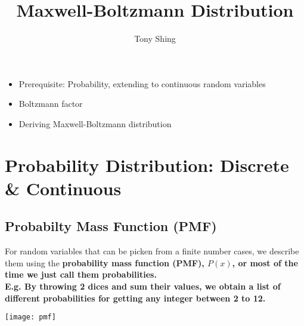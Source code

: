 \documentclass[class=article, crop=false, 12pt]{standalone}
\author{Tony Shing}
\title{Maxwell-Boltzmann Distribution}
\begin{document}
\maketitle


\begin{overview}
    \begin{itemize}
        \item Prerequisite: Probability, extending to continuous random variables
        \item Boltzmann factor
        \item Deriving Maxwell-Boltzmann distribution
    \end{itemize}

\end{overview}


\section{Probability Distribution: Discrete \& Continuous}

\subsection{Probabilty Mass Function (PMF)}

For random variables that can be picken from a finite number cases,
we describe them using the \bf{probability mass function} (PMF), $P(x)$,
or most of the time we just call them probabilities.\\

E.g. By throwing 2 dices and sum their values, 
we obtain a list of different probabilities for getting any integer between 2 to 12.

\begin{center}
    \begin{minipage}{0.55\linewidth}
        \centering
        \texttt{[image: pmf]}
    \end{minipage}
\end{center}
\end{document}

